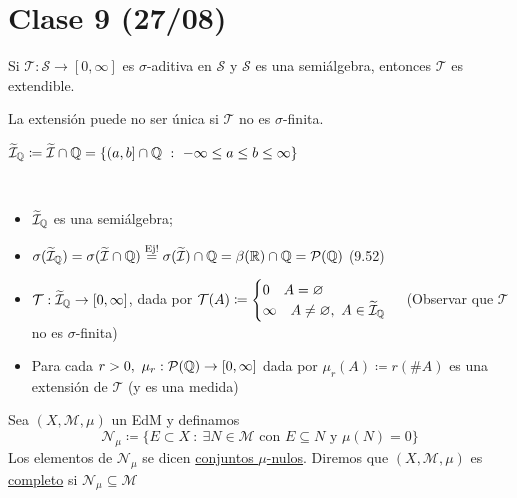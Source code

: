 
\section{Clase 9 (27/08)}

\begin{remark}
	Si $\mathcal{T} : \mathscr{S} \to [0,\infty]$ es $\sigma$-aditiva en $\mathscr{S}$ y $\mathscr{S}$ es una semiálgebra, entonces $\mathcal{T}$ es extendible.
\end{remark}

\begin{remark}
	La extensión puede no ser única si $\mathcal{T}$ no es $\sigma$-finita.
\end{remark}
\begin{eg}
	$\widetilde{\mathcal{I}}_{\mathbb{Q}} \coloneq \widetilde{\mathcal{I}} \cap \mathbb{Q} = \{ (a,b] \cap \mathbb{Q} \ : \ -\infty \leq a \leq b \leq \infty \}$ 
\end{eg}

\begin{note}~
	\begin{itemize}
		\item $\widetilde{\mathcal{I}}_{\mathbb{Q}}$ es una semiálgebra;

		\item $\sigma (\widetilde{\mathcal{I}}_{\mathbb{Q}}) = \sigma (\widetilde{\mathcal{I}} \cap \mathbb{Q}) \stackrel{\text{Ej!}}{=} \sigma (\widetilde{\mathcal{I}}) \cap \mathbb{Q} = \beta(\mathbb{R}) \cap \mathbb{Q} = \mathcal{P}(\mathbb{Q})$ (9.52)

	\item $\mathcal{T} : \widetilde{\mathcal{I}}_{\mathbb{Q}} \to [0,\infty]$, dada por $\mathcal{T}(A) \coloneq \begin{cases}
			0 \quad A = \varnothing \\
			\infty \quad A \neq \varnothing,\ A \in \widetilde{\mathcal{I}}_{\mathbb{Q}}
		\end{cases}$ (Observar que $\mathcal{T}$ no es $\sigma$-finita)

		\item Para cada $r > 0,\ \mu_r : \mathcal{P}(\mathbb{Q}) \to [0,\infty]$ dada por $\mu_r(A) \coloneq r(\# A)$ es una extensión de $\mathcal{T}$ (y es una medida)
	\end{itemize}
\end{note}

\begin{definition}
	Sea $(X,\mathscr{M},\mu)$ un EdM y definamos 
	\[ \mathscr{N}_{\mu} \coloneq \{ E \subset X \ : \ \exists N \in \mathscr{M} \text{ con } E \subseteq N \text{ y } \mu(N) = 0 \} \] 
	Los elementos de $\mathscr{N}_{\mu}$ se dicen \underline{conjuntos $\mu$-nulos}. Diremos que $(X,\mathscr{M},\mu)$ es \underline{completo} si $\mathscr{N}_{\mu} \subseteq \mathscr{M}$
\end{definition}

